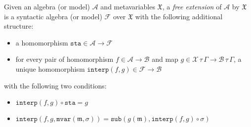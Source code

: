 \documentclass[11pt,a4paper]{article}
\newcommand*\term[1]{\ensuremath{\mathbb{T}{[{#1}]}}}
\begin{document}





Given an algebra (or model) \(\mathcal{A}\) and metavariables \(\mathfrak{X}\), a \emph{free
extension} of \(\mathcal{A}\) by \(\mathfrak{X}\) is a syntactic algebra (or model) \(\mathcal{F}\) over \(\mathfrak{X}\)
with the following additional structure:

\begin{itemize}
\item a homomorphism \(\mathtt{sta} \in {\mathcal{A}\to\mathcal{F}}\)
\item for every pair of homomorphism \(f \in {\mathcal{A}\to\mathcal{B}}\) and map \(g \in
  {{\mathcal{X}\,\tau\,\Gamma}\to{\mathcal{B}\,\tau\,\Gamma}}\), a unique homomorphism \(\mathtt{interp}(f,g) \in
  {\mathcal{F}\to\mathcal{B}}\)
\end{itemize}

with the following two conditions:

\begin{itemize}
\item \({{\mathtt{interp}(f,g)}\circ\mathtt{sta}} = g\)
\item
  \({{\mathtt{interp}(f,g,{\mathtt{mvar}(\mathfrak{m},\sigma)})}} =
    {\mathtt{sub}(g(\mathfrak{m}),{{\mathtt{interp}(f,g)} \circ \sigma})}\)
\end{itemize}
\end{document}

